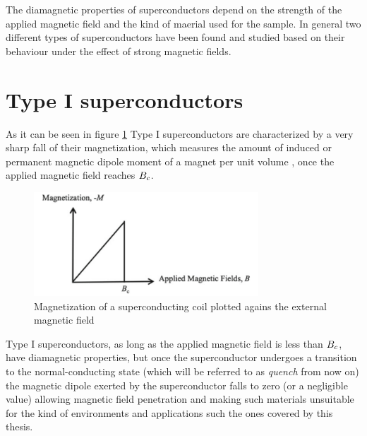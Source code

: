 The diamagnetic properties of superconductors depend on the strength of the applied magnetic field
and the kind of maerial used for the sample. In general two different types of superconductors have
been found and studied based on their behaviour under the effect of strong magnetic fields.

\section{Type I superconductors}
\label{sec:type1}
As it can be seen in figure \ref{img:type1-transition} Type I superconductors are characterized by a very
sharp fall of their magnetization, which measures the amount of induced or
permanent magnetic dipole moment of a magnet per unit volume \cite{polarization-magnetization}, once
the applied magnetic field reaches $B_c$.
\begin{figure}
	\centering
	\includegraphics[width=0.75\textwidth]{./img/type1.png}
	\caption{Magnetization of a superconducting coil plotted agains the external magnetic field
		\cite{slimani2022superconducting}}
	\label{img:type1-transition}
\end{figure}
Type I superconductors, as long as the applied magnetic field is less than $B_c$, have diamagnetic
properties, but once the superconductor undergoes a transition to the normal-conducting
state (which will be referred to as \emph{quench} from now on) the magnetic dipole exerted by the
superconductor falls to zero (or a negligible value) allowing magnetic field penetration and making such materials unsuitable for the kind of environments and applications such the ones covered by this thesis.

